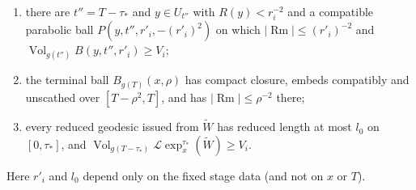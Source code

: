 \begin{proposition}
\begin{enumerate}
      of $[T_{i-1},T)$;
\item there are $t''=T-\tau_*$ and $y\in U_{t''}$ with
      $R(y)<r_i^{-2}$ and a compatible parabolic ball
      $P(y,t'',r'_i,-(r'_i)^2)$ on which
      $|\operatorname{Rm}|\le(r'_i)^{-2}$ and
      $\operatorname{Vol}_{g(t'')}B(y,t'',r'_i)\ge V_i$;
\item the terminal ball $B_{g(T)}(x,\rho)$ has compact closure, embeds
      compatibly and unscathed over $[T-\rho^2,T]$, and has
      $|\operatorname{Rm}|\le\rho^{-2}$ there;
\item every reduced geodesic issued from $\widetilde W$ has reduced length at
      most $l_0$ on $[0,\tau_*]$, and
      $\operatorname{Vol}_{g(T-\tau_*)}
      \mathcal L\exp_x^{\tau_*}(\widetilde W)\ge V_i$.
\end{enumerate}
Here $r'_i$ and $l_0$ depend only on the fixed stage data (and not on $x$ or
$T$).
\end{proposition}


